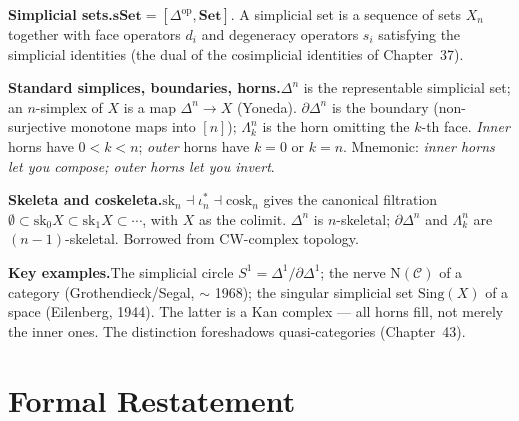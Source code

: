 \begin{summarybox}
\textbf{Simplicial sets.}\quad $\mathbf{sSet} = [\Delta^{\mathrm{op}},
\mathbf{Set}]$. A simplicial set is a sequence of sets $X_n$ together
with face operators $d_i$ and degeneracy operators $s_i$ satisfying the
simplicial identities (the dual of the cosimplicial identities of
Chapter~37).

\textbf{Standard simplices, boundaries, horns.}\quad $\Delta^n$ is the
representable simplicial set; an $n$-simplex of $X$ is a map $\Delta^n
\to X$ (Yoneda). $\partial\Delta^n$ is the boundary (non-surjective
monotone maps into $[n]$); $\Lambda^n_k$ is the horn omitting the
$k$-th face. \emph{Inner} horns have $0 < k < n$; \emph{outer} horns
have $k = 0$ or $k = n$. Mnemonic: \emph{inner horns let you compose;
outer horns let you invert}.

\textbf{Skeleta and coskeleta.}\quad $\mathrm{sk}_n \dashv \iota_n^*
\dashv \mathrm{cosk}_n$ gives the canonical filtration $\emptyset \subset
\mathrm{sk}_0 X \subset \mathrm{sk}_1 X \subset \cdots$, with $X$ as the
colimit. $\Delta^n$ is $n$-skeletal; $\partial\Delta^n$ and $\Lambda^n_k$
are $(n-1)$-skeletal. Borrowed from CW-complex topology.

\textbf{Key examples.}\quad The simplicial circle $S^1 = \Delta^1 /
\partial\Delta^1$; the nerve $\mathrm{N}(\mathcal{C})$ of a category
(Grothendieck/Segal, $\sim$ 1968); the singular simplicial set
$\mathrm{Sing}(X)$ of a space (Eilenberg, 1944). The latter is a Kan
complex — all horns fill, not merely the inner ones. The distinction
foreshadows quasi-categories (Chapter~43).
\end{summarybox}


\section*{Formal Restatement}

